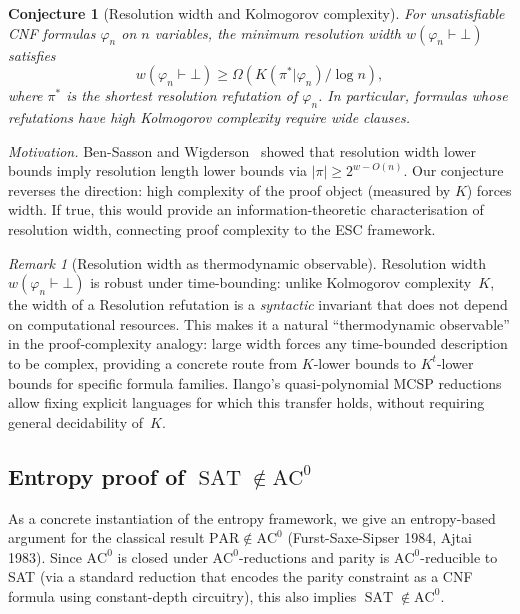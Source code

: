 \documentclass[aps,prd,twocolumn,superscriptaddress,nofootinbib]{revtex4-2}
\newtheorem{conjecture}[theorem]{Conjecture}
\theoremstyle{definition}
\theoremstyle{remark}
\newtheorem{remark}[theorem]{Remark}
\DeclareMathOperator{\SAT}{SAT}
\begin{document}
\begin{conjecture}[Resolution width and Kolmogorov complexity]
\label{conj:resolution-width}
For unsatisfiable CNF formulas $\varphi_n$ on $n$ variables, the minimum resolution width $w(\varphi_n \vdash \bot)$ satisfies
\[
w(\varphi_n \vdash \bot) \geq \Omega\left( K(\pi^* | \varphi_n) / \log n \right),
\]
where $\pi^*$ is the shortest resolution refutation of $\varphi_n$. In particular, formulas whose refutations have high Kolmogorov complexity require wide clauses.
\end{conjecture}

\textit{Motivation.} Ben-Sasson and Wigderson~\cite{BenSasson2001} showed that resolution width lower bounds imply resolution length lower bounds via $|\pi| \geq 2^{w - O(n)}$. Our conjecture reverses the direction: high complexity of the proof object (measured by $K$) forces width. If true, this would provide an information-theoretic characterisation of resolution width, connecting proof complexity to the ESC framework.

\begin{remark}[Resolution width as thermodynamic observable]\label{rem:width-observable}
Resolution width $w(\varphi_n \vdash \bot)$ is robust under time-bounding: unlike Kolmogorov complexity~$K$, the width of a Resolution refutation is a \emph{syntactic} invariant that does not depend on computational resources. This makes it a natural ``thermodynamic observable'' in the proof-complexity analogy: large width forces any time-bounded description to be complex, providing a concrete route from $K$-lower bounds to $K^t$-lower bounds for specific formula families. Ilango's quasi-polynomial MCSP reductions \cite{Ilango2026} allow fixing explicit languages for which this transfer holds, without requiring general decidability of~$K$.
\end{remark}

\subsection{Entropy proof of $\SAT \notin \mathrm{AC}^0$}
\label{sec:ac0}

As a concrete instantiation of the entropy framework, we give an entropy-based argument for the classical result $\mathrm{PAR} \notin \mathrm{AC}^0$ (Furst-Saxe-Sipser 1984, Ajtai 1983). Since $\mathrm{AC}^0$ is closed under $\mathrm{AC}^0$-reductions and parity is $\mathrm{AC}^0$-reducible to SAT (via a standard reduction that encodes the parity constraint as a CNF formula using constant-depth circuitry), this also implies $\SAT \notin \mathrm{AC}^0$.
\end{document}
